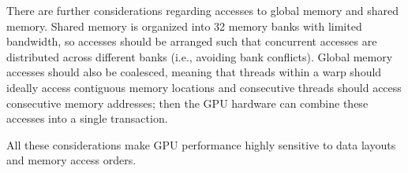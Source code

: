 There are further considerations regarding accesses to global memory and shared memory. Shared memory is organized into 32 memory banks with limited bandwidth, so accesses should be arranged such that concurrent accesses are distributed across different banks (i.e., avoiding bank conflicts). Global memory accesses should also be coalesced, meaning that threads within a warp should ideally access contiguous memory locations and consecutive threads should access consecutive memory addresses; then the GPU hardware can combine these accesses into a single transaction.

All these considerations make GPU performance highly sensitive to data layouts and memory access orders.





